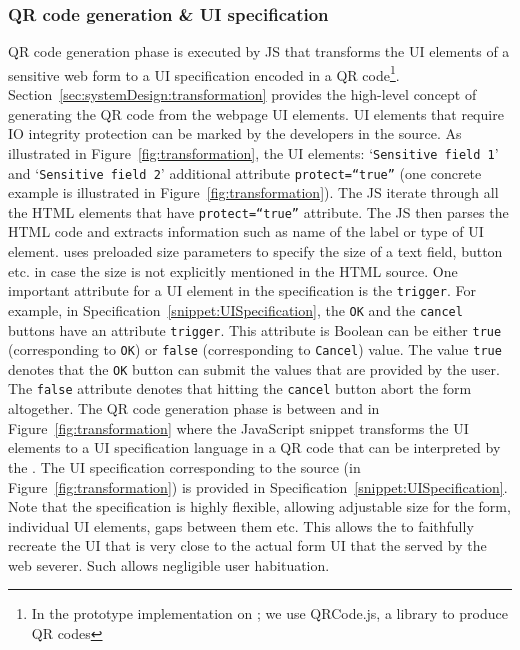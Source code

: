 \subsubsection{\bfseries QR code generation \& UI specification}
\label{sec:prototype:impl:qr}

QR code generation phase is executed by \name JS that transforms the UI elements of a sensitive web form to a UI specification encoded in a QR code\footnote{In the prototype implementation on \name; we use QRCode.js, a \js library to produce QR codes}. 
Section~\ref{sec:systemDesign:transformation} provides the high-level concept of generating the QR code from the webpage UI elements. UI elements that require IO integrity protection can be marked by the developers in the \html source. As illustrated in Figure~\ref{fig:transformation}, the \html UI elements: `\texttt{Sensitive field 1}' and `\texttt{Sensitive field 2}' additional attribute \texttt{protect=``true''} (one concrete example is illustrated in Figure~\ref{fig:transformation}). The \name JS iterate through all the HTML elements that have \texttt{protect=``true''} attribute. The JS then parses the HTML code and extracts information such as name of the label or type of UI element. \device uses preloaded size parameters to specify the size of a text field, button etc. in case the size is not explicitly mentioned in the HTML source. One important attribute for a UI element in the specification is the \texttt{trigger}. For example, in Specification~\ref{snippet:UISpecification}, the \texttt{OK} and the \texttt{cancel} buttons have an attribute \texttt{trigger}. This attribute is Boolean can be either \texttt{true} (corresponding to \texttt{OK}) or \texttt{false} (corresponding to \texttt{Cancel}) value. The value \texttt{true} denotes that the \texttt{OK} button can submit the values that are provided by the user. The \texttt{false} attribute denotes that hitting the \texttt{cancel} button abort the form altogether.
The QR code generation phase is between \one and \two in Figure~\ref{fig:transformation} where the \name JavaScript snippet transforms the UI elements to a UI specification language in a QR code that can be interpreted by the \device. The UI specification corresponding to the \html source (in Figure~\ref{fig:transformation}) is provided in Specification~\ref{snippet:UISpecification}. Note that the specification is highly flexible, allowing adjustable size for the form, individual UI elements, gaps between them etc. This allows the \device to faithfully recreate the UI that is very close to the actual form UI that the served by the web severer. Such allows negligible user habituation. 

